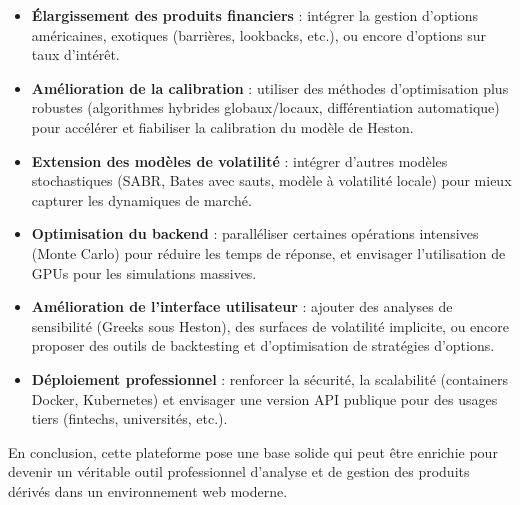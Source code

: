 \begin{itemize}
	\item \textbf{Élargissement des produits financiers} : intégrer la gestion d'options américaines, exotiques (barrières, lookbacks, etc.), ou encore d'options sur taux d'intérêt.
	
	\item \textbf{Amélioration de la calibration} : utiliser des méthodes d'optimisation plus robustes (algorithmes hybrides globaux/locaux, différentiation automatique) pour accélérer et fiabiliser la calibration du modèle de Heston.
	
	\item \textbf{Extension des modèles de volatilité} : intégrer d'autres modèles stochastiques (SABR, Bates avec sauts, modèle à volatilité locale) pour mieux capturer les dynamiques de marché.
	
	\item \textbf{Optimisation du backend} : paralléliser certaines opérations intensives (Monte Carlo) pour réduire les temps de réponse, et envisager l'utilisation de GPUs pour les simulations massives.
	
	\item \textbf{Amélioration de l'interface utilisateur} : ajouter des analyses de sensibilité (Greeks sous Heston), des surfaces de volatilité implicite, ou encore proposer des outils de backtesting et d'optimisation de stratégies d'options.
	
	\item \textbf{Déploiement professionnel} : renforcer la sécurité, la scalabilité (containers Docker, Kubernetes) et envisager une version API publique pour des usages tiers (fintechs, universités, etc.).
\end{itemize}

En conclusion, cette plateforme pose une base solide qui peut être enrichie pour devenir un véritable outil professionnel d'analyse et de gestion des produits dérivés dans un environnement web moderne.

